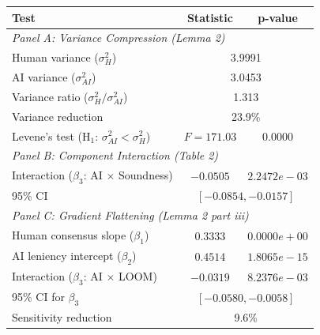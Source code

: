 \begin{tabular}{lcc}
\toprule
\textbf{Test} & \textbf{Statistic} & \textbf{p-value} \\
\midrule
\multicolumn{3}{l}{\textit{Panel A: Variance Compression (Lemma 2)}} \\
\midrule
Human variance ($\sigma^2_H$) & \multicolumn{2}{c}{3.9991} \\
AI variance ($\sigma^2_{AI}$) & \multicolumn{2}{c}{3.0453} \\
Variance ratio ($\sigma^2_H / \sigma^2_{AI}$) & \multicolumn{2}{c}{1.313} \\
Variance reduction & \multicolumn{2}{c}{23.9\%} \\
Levene's test (H$_1$: $\sigma^2_{AI} < \sigma^2_H$) & $F = 171.03$ & $0.0000$ \\
\midrule
\multicolumn{3}{l}{\textit{Panel B: Component Interaction (Table 2)}} \\
\midrule
Interaction ($\beta_3$: AI $\times$ Soundness) & $-0.0505$ & $2.2472e-03$ \\
95\% CI & \multicolumn{2}{c}{$[-0.0854, -0.0157]$} \\
\midrule
\multicolumn{3}{l}{\textit{Panel C: Gradient Flattening (Lemma 2 part iii)}} \\
\midrule
Human consensus slope ($\beta_1$) & $0.3333$ & $0.0000e+00$ \\
AI leniency intercept ($\beta_2$) & $0.4514$ & $1.8065e-15$ \\
Interaction ($\beta_3$: AI $\times$ LOOM) & $-0.0319$ & $8.2376e-03$ \\
95\% CI for $\beta_3$ & \multicolumn{2}{c}{$[-0.0580, -0.0058]$} \\
Sensitivity reduction & \multicolumn{2}{c}{9.6\%} \\
\bottomrule
\end{tabular}
